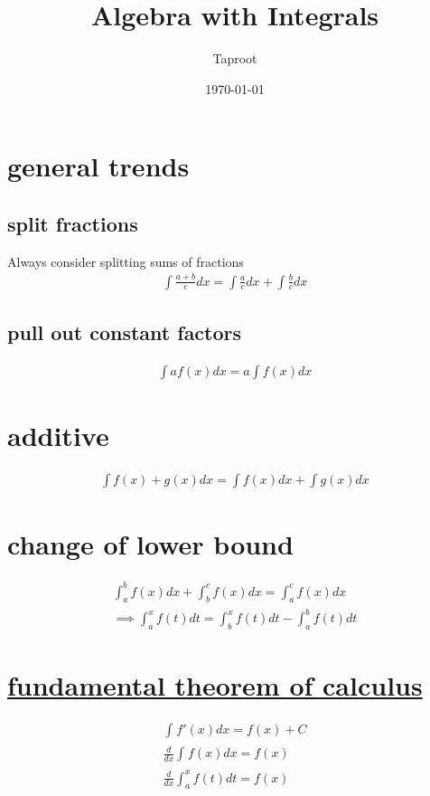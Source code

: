 \documentclass[letterpaper]{article}
\author{Taproot}
\date{\today}
\title{Algebra with Integrals}
\renewcommand{\tableofcontents}{}
\begin{document}
\tableofcontents

\section{general trends}
\label{sec:org3e324de}
\subsection{split fractions}
\label{sec:org316a735}
Always consider splitting sums of fractions
\[\begin{aligned}
   \int \frac{a+b}{c} dx = \int \frac{a}{c} dx +\int \frac{b}{c} dx
   \end{aligned}\]
\subsection{pull out constant factors}
\label{sec:orgae7ced4}

\[\begin{aligned}
   \int af(x) dx = a \int f(x) dx
   \end{aligned}\]


\section{additive}
\label{sec:org7cfaec8}

\[\begin{aligned}
  \int f(x) + g(x) dx = \int f(x) dx  + \int g(x) dx
  \end{aligned}\]

\section{change of lower bound}
\label{sec:org0d5012c}
\[\begin{aligned}
  \int_{a}^{b} f(x) dx + \int_{b}^{c} f(x) dx = \int_{a}^{c} f(x) dx\\
  \implies \int_{a}^{x} f(t) dt = \int_{b}^{x} f(t) dt - \int_{a}^{b} f(t) dt
  \end{aligned}\]

\section{\href{KBrefFundamentalTheoremOfCalculus.org}{fundamental theorem of calculus}}
\label{sec:org8bde722}

\[\begin{aligned}
  \int_{}^{} f'(x) dx = f(x) + C\\
  \frac{d}{dx} \int_{}^{} f(x) dx = f(x)\\
  \frac{d}{dx} \int_{a}^{x} f(t) dt = f(x)
  \end{aligned}\]
\end{document}
